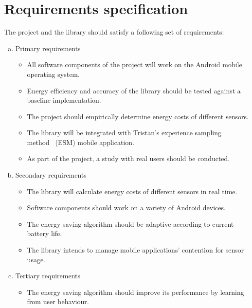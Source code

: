 \section{Requirements specification}
\label{s:requirements}
The project and the library should satisfy a following set of requirements:
\begin{enumerate}[(a)]
 \item Primary requirements
  \begin{itemize}
  	\item All software components of the project will work on the Android mobile operating 
system.
    \item Energy efficiency and accuracy of the library should be tested against a baseline 
implementation.
    \item The project should empirically determine energy costs of different sensors.
    \item The library will be integrated with Tristan's experience sampling method~ (ESM) mobile application.
    \item As part of the project, a study with real users should be conducted.
  \end{itemize}
  \item Secondary requirements
  \begin{itemize}
	\item The library will calculate energy costs of different sensors in real time.
  	\item Software components should work on a variety of Android devices.
    \item The energy saving algorithm should be adaptive according to current battery life.
    \item The library intends to manage mobile applications' contention for sensor usage.  
  \end{itemize}
  \item Tertiary requirements
  \begin{itemize}
  	\item The energy saving algorithm should improve its performance by learning from user behaviour. 
  \end{itemize}
\end{enumerate}